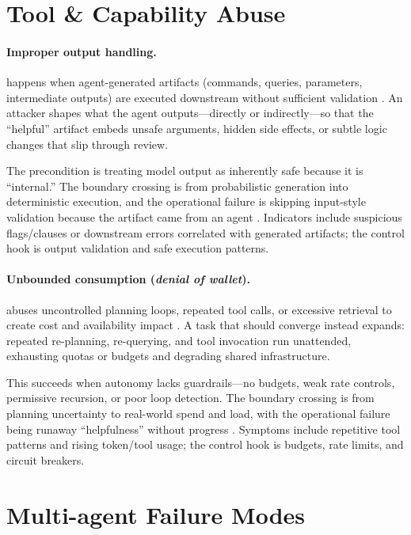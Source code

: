 \begin{TNtwocol}
  \section{Tool \& Capability Abuse}

  \paragraph{Improper output handling.} happens when agent-generated artifacts (commands, queries, parameters, intermediate outputs) are executed downstream without sufficient validation \cite{owasp-top10-llm-2025,owasp-prompt-injection-cheatsheet}. An attacker shapes what the agent outputs—directly or indirectly—so that the “helpful” artifact embeds unsafe arguments, hidden side effects, or subtle logic changes that slip through review.

  The precondition is treating model output as inherently safe because it is “internal.” The boundary crossing is from probabilistic generation into deterministic execution, and the operational failure is skipping input-style validation because the artifact came from an agent \cite{owasp-top10-llm-2025,owasp-prompt-injection-cheatsheet}. Indicators include suspicious flags/clauses or downstream errors correlated with generated artifacts; the control hook is output validation and safe execution patterns.

  \paragraph{Unbounded consumption (\emph{denial of wallet}).} abuses uncontrolled planning loops, repeated tool calls, or excessive retrieval to create cost and availability impact \cite{owasp-top10-llm-2025,cisa-ztmm-v2}. A task that should converge instead expands: repeated re-planning, re-querying, and tool invocation run unattended, exhausting quotas or budgets and degrading shared infrastructure.

  This succeeds when autonomy lacks guardrails—no budgets, weak rate controls, permissive recursion, or poor loop detection. The boundary crossing is from planning uncertainty to real-world spend and load, with the operational failure being runaway “helpfulness” without progress \cite{owasp-top10-llm-2025,cisa-ztmm-v2}. Symptoms include repetitive tool patterns and rising token/tool usage; the control hook is budgets, rate limits, and circuit breakers.

  \section{Multi-agent Failure Modes}


\end{TNtwocol}
